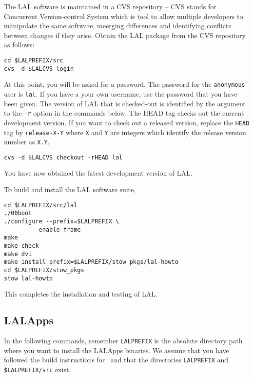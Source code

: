 The LAL software is maintained in a CVS repository -- CVS stands for
Concurrent Version-control System which is tool to allow multiple developers
to manipulate the same software,  meerging differences and identifying
conflicts between changes if they arise.  Obtain the LAL package from the CVS
repository as follows:  
\begin{verbatim}
cd $LALPREFIX/src
cvs -d $LALCVS login
\end{verbatim}
At this point,  you will be asked for a password.  The password for the
\verb+anonymous+ user is \verb+lal+. If you have a your own username, use the
password that you have been given.
The version of LAL that is checked-out is identified by the argument
to the \texttt{-r} option in the commands below.   The HEAD tag checks out the
current development version.  If you want to check out a released
version, replace the \verb+HEAD+ tag by \verb+release-X-Y+ where
\verb+X+ and \verb+Y+ are integers which identify the release version
number as \verb+X.Y+.
\begin{verbatim}
cvs -d $LALCVS checkout -rHEAD lal
\end{verbatim}
You have now obtained the latest development version of LAL.

To build and install the LAL software suite, 
\begin{verbatim}
cd $LALPREFIX/src/lal
./00boot
./configure --prefix=$LALPREFIX \
        --enable-frame
make
make check
make dvi
make install prefix=$LALPREFIX/stow_pkgs/lal-howto
cd $LALPREFIX/stow_pkgs
stow lal-howto
\end{verbatim}
This completes the installation and testing of LAL.  

\color{black}
\subsection{LALApps}
\color{black}

In the following commands, remember \verb+LALPREFIX+ is the absolute
directory path where you want to install the LALApps binaries.  We
assume that you have followed the build instructions for \lal\ and
that the directories \verb+LALPREFIX+ and \verb+$LALPREFIX/src+ exist.

